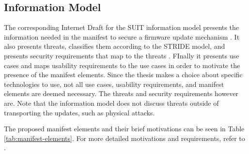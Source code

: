 \documentclass[0-thesis.tex]{subfiles}
\begin{document}

\subsection{Information Model}
\label{ssec:information-model}
The corresponding Internet Draft for the SUIT information model presents the information
needed in the manifest to secure a firmware update mechanism
\parencite{suit-information-model}. It also presents threats, classifies them according to
the STRIDE model, and presents security requirements that map to the threats
\parencite{stride}. FInally it presents use cases and maps usability requirements to the
use cases in order to motivate the presence of the manifest elements. Since the thesis
makes a choice about specific technologies to use, not all use cases, usability
requirements, and manifest elements are deemed necessary. The threats and security
requirements however are. Note that the information model does not discuss threats outside
of transporting the updates, such as physical attacks.

The proposed manifest elements and their brief motivations can be seen in Table
\ref{tab:manifest-elements}. For more detailed motivations and requirements, refer to
\parencite{suit-information-model}.
\end{document}
